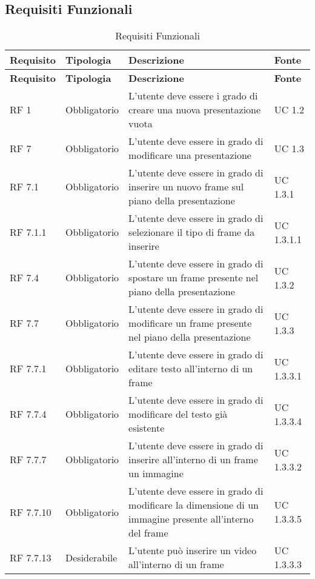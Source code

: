 \subsection{Requisiti Funzionali}{
		\renewcommand*{\arraystretch}{1.4}
		\begin{longtable} [c]{| p{2.5cm} | p{2.5cm} | p{6cm} |p{2.5cm}|}
			\caption{Requisiti Funzionali \label{tab:reqFunzionali}}\\
			 \hline
			 \textbf{Requisito} & \textbf{Tipologia} & \textbf{Descrizione} & \textbf{Fonte} \\
			 \hline
			 \endfirsthead
			 \hline
			 \textbf{Requisito} & \textbf{Tipologia} & \textbf{Descrizione} & \textbf{Fonte} \\
			 \hline
				\endhead
			 \hline
			 \endfoot
			 \hline
			 \endlastfoot
			RF 1 & Obbligatorio & L’utente deve essere i grado di creare una nuova presentazione vuota & UC 1.2\\
			\hline
			RF 7 & Obbligatorio & L'utente deve essere in grado di modificare una presentazione & UC 1.3\\
			\hline
			RF 7.1 & Obbligatorio & L'utente deve essere in grado di inserire un nuovo frame sul piano della presentazione & UC 1.3.1\\
			\hline
			RF 7.1.1 & Obbligatorio & L'utente deve essere in grado di selezionare il tipo di frame da inserire & UC 1.3.1.1\\
			\hline
			RF 7.4 & Obbligatorio & L'utente deve essere in grado di spostare un frame presente nel piano della presentazione & UC 1.3.2\\
			\hline
			RF 7.7 & Obbligatorio & L'utente deve essere in grado di modificare un frame presente nel piano della presentazione & UC 1.3.3\\
			\hline
			RF 7.7.1 & Obbligatorio & L'utente deve essere in grado di editare testo all'interno di un frame & UC 1.3.3.1\\
			\hline
			RF 7.7.4 & Obbligatorio & L'utente deve essere in grado di modificare del testo già esistente & UC 1.3.3.4\\
			\hline
			RF 7.7.7 & Obbligatorio & L'utente deve essere in grado di inserire all'interno di un frame un immagine & UC 1.3.3.2\\
			\hline
			RF 7.7.10 & Obbligatorio & L'utente deve essere in grado di modificare la dimensione di un immagine presente all'interno del frame & UC 1.3.3.5\\
			\hline
			RF 7.7.13 & Desiderabile & L'utente può inserire un video all'interno di un frame & UC 1.3.3.3\\

\end{longtable}}

